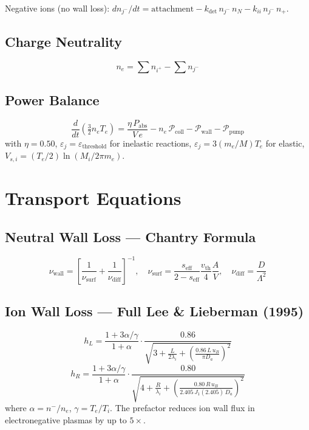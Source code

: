 \documentclass[11pt,a4paper]{article}
\begin{document}
Negative ions (no wall loss): $dn_{j^-}/dt = \text{attachment} - k_\text{det}\,n_{j^-}\,n_N - k_{ii}\,n_{j^-}\,n_+$.

\subsection{Charge Neutrality}
\begin{equation}
n_e = \sum n_{i^+} - \sum n_{j^-}
\end{equation}

\subsection{Power Balance}
\begin{equation}\label{eq:power}
\boxed{\frac{d}{dt}\!\left(\tfrac{3}{2}n_e T_e\right) = \frac{\eta\,P_\text{abs}}{V\,e} - n_e\,\mathcal{P}_\text{coll} - \mathcal{P}_\text{wall} - \mathcal{P}_\text{pump}}
\end{equation}
with $\eta = 0.50$, $\varepsilon_j = \varepsilon_\text{threshold}$ for inelastic reactions, $\varepsilon_j = 3(m_e/M)T_e$ for elastic, $V_{s,i} = (T_e/2)\ln(M_i/2\pi m_e)$.

\section{Transport Equations}

\subsection{Neutral Wall Loss --- Chantry Formula}
\begin{equation}
\boxed{\nu_\text{wall} = \left[\frac{1}{\nu_\text{surf}} + \frac{1}{\nu_\text{diff}}\right]^{-1}}, \quad \nu_\text{surf} = \frac{s_\text{eff}}{2-s_\text{eff}}\frac{v_\text{th}}{4}\frac{A}{V}, \quad \nu_\text{diff} = \frac{D}{\Lambda^2}
\end{equation}

\subsection{Ion Wall Loss --- Full Lee \& Lieberman (1995)}
\begin{equation}
\boxed{h_L = \frac{1+3\alpha/\gamma}{1+\alpha} \cdot \frac{0.86}{\sqrt{3 + \frac{L}{2\lambda_i} + \left(\frac{0.86\,L\,u_B}{\pi D_a}\right)^2}}}
\end{equation}
\begin{equation}
\boxed{h_R = \frac{1+3\alpha/\gamma}{1+\alpha} \cdot \frac{0.80}{\sqrt{4 + \frac{R}{\lambda_i} + \left(\frac{0.80\,R\,u_B}{2.405\,J_1(2.405)\,D_a}\right)^2}}}
\end{equation}
where $\alpha = n^-/n_e$, $\gamma = T_e/T_i$. The prefactor reduces ion wall flux in electronegative plasmas by up to $5\times$.
\end{document}

